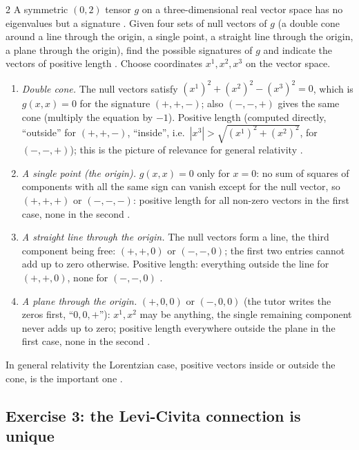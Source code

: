 \begin{paracol}{2}
A symmetric $(0,2)$ tensor $g$ on a three-dimensional real vector space has no eigenvalues but a signature . Given four sets of null vectors of $g$ (a double cone around a line through the origin, a single point, a straight line through the origin, a plane through the origin), find the possible signatures of $g$ and indicate the vectors of positive length .
Choose coordinates $x^1,x^2,x^3$ on the vector space.
\begin{enumerate}
  \item \emph{Double cone.} The null vectors satisfy $(x^1)^2+(x^2)^2-(x^3)^2=0$, which is $g(x,x)=0$ for the signature $(+,+,-)$; also $(-,-,+)$ gives the same cone (multiply the equation by $-1$). Positive length (computed directly, ``outside'' for $(+,+,-)$, ``inside'', i.e.\ $|x^3|>\sqrt{(x^1)^2+(x^2)^2}$, for $(-,-,+)$); this is the picture of relevance for general relativity .
  \item \emph{A single point (the origin).} $g(x,x)=0$ only for $x=0$: no sum of squares of components with all the same sign can vanish except for the null vector, so $(+,+,+)$ or $(-,-,-)$: positive length for all non-zero vectors in the first case, none in the second .
  \item \emph{A straight line through the origin.} The null vectors form a line, the third component being free: $(+,+,0)$ or $(-,-,0)$; the first two entries cannot add up to zero otherwise. Positive length: everything outside the line for $(+,+,0)$, none for $(-,-,0)$ .
  \item \emph{A plane through the origin.} $(+,0,0)$ or $(-,0,0)$ (the tutor writes the zeros first, ``$0,0,+$''): $x^1,x^2$ may be anything, the single remaining component never adds up to zero; positive length everywhere outside the plane in the first case, none in the second .
\end{enumerate}
In general relativity the Lorentzian case, positive vectors inside or outside the cone, is the important one .

\subsection*{Exercise 3: the Levi-Civita connection is unique}


\end{paracol}
